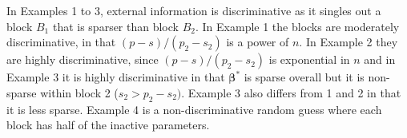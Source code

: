 \documentclass[aos]{imsart}
\theoremstyle{plain}
\newcommand{\paul}[1]{{\small{\color{green} \sf $\spadesuit$ Paul: #1}}}
\newcommand{\bs}{\boldsymbol}
\begin{document}
In Examples 1 to 3, external information is discriminative as it singles out a block $B_1$ that is %
sparser than block $B_2$. 
In Example 1 the blocks are %
moderately discriminative, in that $(p-s)/(p_2-s_2)$ is a power of $n$. In Example 2 they are highly discriminative, since $(p-s)/(p_2-s_2)$ is exponential in $n$ and in Example 3 it is highly discriminative in that $\bs\beta^*$ is sparse overall but it is non-sparse within block 2 ($s_2 > p_2 - s_2)$. %
Example 3 also differs from 1 and 2 in that it is less sparse. %
Example 4 is a non-discriminative \color{black}
random guess where each block has half of the inactive parameters. %

\end{document}
